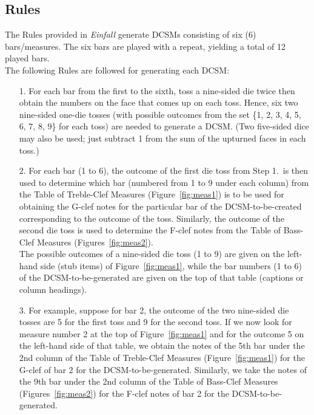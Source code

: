 \documentclass[a4paper,x11names,svgnames,10pt]{article}
\begin{document}
{\subsection{Rules}

The Rules provided in {\em Einfall} generate DCSMs consisting of six (6) bars/measures.  The six bars are played with a repeat, yielding a total of 12 played bars. \\

The following Rules are followed for generating each DCSM:
\begin{enumerate}
	\item [1.] For each bar from the first to the sixth, toss a nine-sided die twice then obtain the numbers on the face that comes up on each toss.  Hence, six two nine-sided one-die tosses (with possible outcomes from the set \{1, 2, 3, 4, 5, 6, 7, 8, 9\} for each toss) are needed to generate a DCSM. (Two five-sided dice may also be used; just subtract 1 from the sum of the upturned faces in each toss.)
	\item [2.] For each bar (1 to 6), the outcome of the first die toss from Step 1.\ is then used to determine which bar (numbered from 1 to 9 under each column) from the Table of Treble-Clef Measures (Figure~\ref{fig:meas1}) is to be used for obtaining the G-clef notes for the particular bar of the DCSM-to-be-created corresponding to the outcome of the toss.  Similarly, the outcome of the second die toss is used to determine the F-clef notes from the Table of Bass-Clef Measures (Figures~\ref{fig:meas2}).  \\
	The possible outcomes of a nine-sided die toss (1 to 9) are given on the left-hand side (stub items) of Figure~\ref{fig:meas1}, while the bar numbers (1 to 6) of the DCSM-to-be-generated are given on the top of that table (captions or column  headings).
	\item [3.]  For example, suppose for bar 2, the outcome of the two nine-sided die tosses are 5 for the first toss and 9 for the second toss.  If we now look for measure number 2 at the top of Figure~\ref{fig:meas1} and for the outcome 5 on the left-hand side of that table, we obtain the notes of the 5th bar under the 2nd column of the Table of Treble-Clef Measures (Figure~\ref{fig:meas1}) for the G-clef of bar 2 for the DCSM-to-be-generated.  Similarly, we take the notes of the 9th bar under the 2nd column of the Table of Bass-Clef Measures (Figures~\ref{fig:meas2}) for the F-clef notes of bar 2 for the DCSM-to-be-generated.
\end{enumerate}   


}
\end{document}
